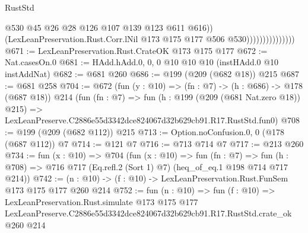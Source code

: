 \begin{lexlean}{RustStd}
\begin{coremodule}
                                    @530
                                    @45
                                    @26
                                    @28
                                    @126
                                    @107
                                    @139
                                    @123
                                    @611
                                    @616))
                                (LexLeanPreservation.Rust.Corr.lNil
                                  @173
                                  @175
                                  @177
                                  @506
                                  @530)))))))))))))))
@671 := LexLeanPreservation.Rust.CrateOK @173 @175 @177
@672 := Nat.casesOn.{0}
@681 := HAdd.hAdd.{0, 0, 0} @10 @10 @10 (instHAdd.{0} @10 instAddNat)
@682 := @681 @260
@686 := @199 (@209 (@682 @18)) @215
@687 := @681 @258
@704 := @672
    (fun (y : @10) => (fn : @7) -> (h : @686) -> @178 (@687 @18))
    @214
    (fun (fn : @7) =>
    fun (h : @199 (@209 (@681 Nat.zero @18)) @215) =>
    LexLeanPreserve.C2886e55d3342dce824067d32b629cb91.R17.RustStd.fun0)
@708 := @199 (@209 (@682 @112)) @215
@713 := Option.noConfusion.{0, 0} (@178 (@687 @112)) @7
@714 := @121 @7
@716 := @713 @714 @7
@717 := @213 @260
@734 := fun (x : @10) =>
  @704
    (fun (x : @10) =>
    fun (fn : @7) =>
    fun (h : @708) => @716 @717 (Eq.refl.{2} (Sort 1) @7) (heq_of_eq.{1} @198 @714 @717 @214))
@742 := (n : @10) -> (f : @10) -> LexLeanPreservation.Rust.FunSem @173 @175 @177 @260 @214
@752 := fun (n : @10) =>
  fun (f : @10) =>
  LexLeanPreservation.Rust.simulate
    @173
    @175
    @177
    LexLeanPreserve.C2886e55d3342dce824067d32b629cb91.R17.RustStd.crate_ok
    @260
    @214
\end{coremodule}
\end{lexlean}
